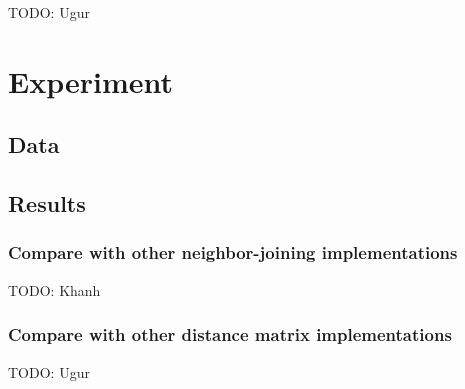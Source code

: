 \documentclass[11pt,letterpaper]{article}
\theoremstyle{definition}
\begin{document}
TODO: Ugur

\section{Experiment}
\subsection{Data}


\subsection{Results}
\subsubsection{Compare with other neighbor-joining implementations}

TODO: Khanh 

\subsubsection{Compare with other distance matrix implementations}

TODO: Ugur
\end{document}
